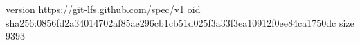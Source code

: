 version https://git-lfs.github.com/spec/v1
oid sha256:0856fd2a34014702af85ae296cb1cb51d025f3a33f3ea10912f0ee84ca1750dc
size 9393
